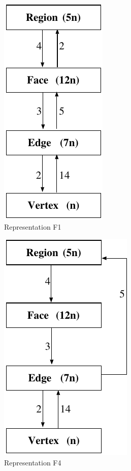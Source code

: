 \documentclass[12pt]{article}
\begin{document}
\begin{figure}[!ht]
  \begin{center}
    \begin{minipage}{2.525in}
      \begin{center}
        \includegraphics[scale=0.9]{figures/repF1} \\
        Representation F1
      \end{center}
    \end{minipage}
    \begin{minipage}{2.525in}
      \begin{center}
        \includegraphics[scale=0.9]{figures/repF4} \\
        Representation F4
      \end{center}
    \end{minipage}
    \vspace{5em}


\end{center}
\end{figure}
\end{document}
